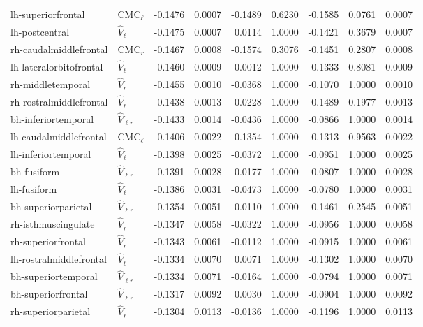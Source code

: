 \documentclass{article}
\begin{document}
\begin{table}
\begin{tabular}{llrrrrrrr}
	lh-superiorfrontal & $\text{CMC}_{\ell}$ & -0.1476 & 0.0007 & -0.1489 & 0.6230 & -0.1585 & 0.0761 & 0.0007 \\
	lh-postcentral & $\hat{V}_{\ell}$ & -0.1475 & 0.0007 & 0.0114 & 1.0000 & -0.1421 & 0.3679 & 0.0007 \\
	rh-caudalmiddlefrontal & $\text{CMC}_r$ & -0.1467 & 0.0008 & -0.1574 & 0.3076 & -0.1451 & 0.2807 & 0.0008 \\
	lh-lateralorbitofrontal & $\hat{V}_{\ell}$ & -0.1460 & 0.0009 & -0.0012 & 1.0000 & -0.1333 & 0.8081 & 0.0009 \\
	rh-middletemporal & $\hat{V}_{r}$ & -0.1455 & 0.0010 & -0.0368 & 1.0000 & -0.1070 & 1.0000 & 0.0010 \\
	rh-rostralmiddlefrontal & $\hat{V}_{r}$ & -0.1438 & 0.0013 & 0.0228 & 1.0000 & -0.1489 & 0.1977 & 0.0013 \\
	bh-inferiortemporal & $\hat{V}_{\ell r}$ & -0.1433 & 0.0014 & -0.0436 & 1.0000 & -0.0866 & 1.0000 & 0.0014 \\
	lh-caudalmiddlefrontal & $\text{CMC}_{\ell}$ & -0.1406 & 0.0022 & -0.1354 & 1.0000 & -0.1313 & 0.9563 & 0.0022 \\
	lh-inferiortemporal & $\hat{V}_{\ell}$ & -0.1398 & 0.0025 & -0.0372 & 1.0000 & -0.0951 & 1.0000 & 0.0025 \\
	bh-fusiform & $\hat{V}_{\ell r}$ & -0.1391 & 0.0028 & -0.0177 & 1.0000 & -0.0807 & 1.0000 & 0.0028 \\
	lh-fusiform & $\hat{V}_{\ell}$ & -0.1386 & 0.0031 & -0.0473 & 1.0000 & -0.0780 & 1.0000 & 0.0031 \\
	bh-superiorparietal & $\hat{V}_{\ell r}$ & -0.1354 & 0.0051 & -0.0110 & 1.0000 & -0.1461 & 0.2545 & 0.0051 \\
	rh-isthmuscingulate & $\hat{V}_{r}$ & -0.1347 & 0.0058 & -0.0322 & 1.0000 & -0.0956 & 1.0000 & 0.0058 \\
	rh-superiorfrontal & $\hat{V}_{r}$ & -0.1343 & 0.0061 & -0.0112 & 1.0000 & -0.0915 & 1.0000 & 0.0061 \\
	lh-rostralmiddlefrontal & $\hat{V}_{\ell}$ & -0.1334 & 0.0070 & 0.0071 & 1.0000 & -0.1302 & 1.0000 & 0.0070 \\
	bh-superiortemporal & $\hat{V}_{\ell r}$ & -0.1334 & 0.0071 & -0.0164 & 1.0000 & -0.0794 & 1.0000 & 0.0071 \\
	bh-superiorfrontal & $\hat{V}_{\ell r}$ & -0.1317 & 0.0092 & 0.0030 & 1.0000 & -0.0904 & 1.0000 & 0.0092 \\
	rh-superiorparietal & $\hat{V}_{r}$ & -0.1304 & 0.0113 & -0.0136 & 1.0000 & -0.1196 & 1.0000 & 0.0113 \\

\end{tabular}
\end{table}
\end{document}
